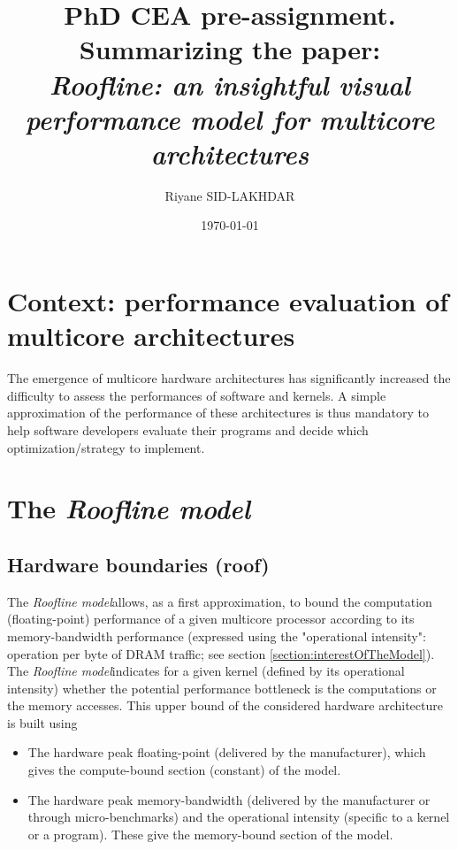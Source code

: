 \documentclass[11pt]{article}											%
\title
{
	PhD CEA pre-assignment.   Summarizing the paper: \\
    \emph{Roofline: an insightful visual performance model for multicore architectures\cite{mainPaper}}
}
\author{Riyane SID-LAKHDAR}
\date{\today}
\newcommand{\targetname}	{\emph{Roofline model}}
\begin{document}
\maketitle






\tableofcontents
\newpage



\section{Context: performance evaluation of multicore architectures}
	The emergence of multicore hardware architectures has significantly increased the difficulty to assess the performances of software and kernels.   A simple approximation of the performance of these architectures is thus mandatory to help software developers evaluate their programs and decide which optimization/strategy to implement.


\section{The \targetname}
	\subsection{Hardware boundaries (roof)}
	The \targetname\space allows, as a first approximation, to bound the computation (floating-point) performance of a given multicore processor according to its memory-bandwidth performance (expressed using the "operational intensity": operation per byte of DRAM traffic; see section \ref{section:interestOfTheModel}).
	The \targetname\space indicates for a given kernel (defined by its operational intensity) whether the potential performance bottleneck is the computations or the memory accesses.
	This upper bound of the considered hardware architecture is built using
	\begin{itemize}
		\item The hardware peak floating-point (delivered by the manufacturer), which gives the compute-bound section (constant) of the model.
		\item The hardware peak memory-bandwidth (delivered by the manufacturer or through micro-benchmarks) and the operational intensity (specific to a kernel or a program).  These give the memory-bound section of the model.
	\end{itemize}
\end{document}
